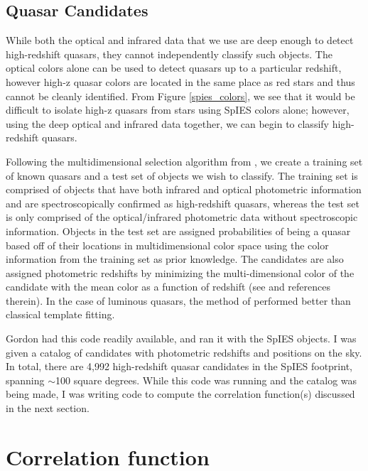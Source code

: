\documentclass[onecolumn]{emulateapj}
\begin{document}
\subsection{Quasar Candidates}
While both the optical and infrared data that we use are deep enough to detect high-redshift quasars, they cannot independently classify such objects. The optical colors alone can be used to detect quasars up to a particular redshift, however high-z quasar colors are located in the same place as red stars and thus cannot be cleanly identified. From Figure \ref{spies_colors}, we see that it would be difficult to isolate high-z quasars from stars using SpIES colors alone; however, using the deep optical and infrared data together, we can begin to classify high-redshift quasars.

Following the multidimensional selection algorithm from \citet{Richards2015}, we create a training set of known quasars and a test set of objects we wish to classify. The training set is comprised of objects that have both infrared and optical photometric information and are spectroscopically confirmed as high-redshift quasars, whereas the test set is only comprised of the optical/infrared photometric data without spectroscopic information. Objects in the test set are assigned probabilities of being a quasar based off of their locations in multidimensional color space using the color information from the training set as prior knowledge. The candidates are also assigned photometric redshifts by minimizing the multi-dimensional color of the candidate with the mean color as a function of redshift (see \citealt{Richards2015} and references therein). In the case of luminous quasars, the method of \citealt{Richards2015} performed better than classical template fitting. 

Gordon had this code readily available, and ran it with the SpIES objects. I was given a catalog of candidates with photometric redshifts and positions on the sky. In total, there are 4,992 high-redshift quasar candidates in the SpIES footprint, spanning $\sim$100 square degrees. While this code was running and the catalog was being made, I was writing code to compute the correlation function(s) discussed in the next section. 

\clearpage

\section{Correlation function}\label{corr_funct}
\end{document}
